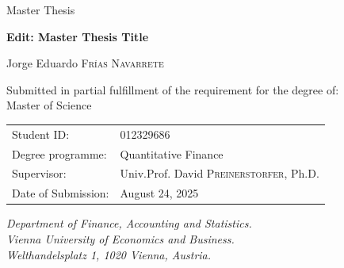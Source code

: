 \documentclass[
  12pt,
  a4paper,
  openany]{scrbook}
\begin{document}
\begin{center}
    \large Master Thesis \\
    \vspace{1cm}

    \textbf{\huge Edit: Master Thesis Title} \\
    \vspace{0.5cm}

        \LARGE Jorge Eduardo \textsc{Frías Navarrete} \\
    \vspace{0.5cm}
        \vspace{2cm}
    
    \normalsize Submitted in partial fulfillment of the requirement for the degree of: \\
    \LARGE Master of Science \\
\vspace{2cm}

\normalsize
    \begin{tabular}{ll}
        Student ID: & 012329686 \\
        Degree programme: & Quantitative Finance \\
        Supervisor: & Univ.Prof. David \textsc{Preinerstorfer}, Ph.D. \\
        Date of Submission: & August 24, 2025
    \end{tabular}
    \vspace{2cm}
    
    \textit{
      Department of Finance, Accounting and Statistics. \\
      Vienna University of Economics and Business. \\
      Welthandelsplatz 1, 1020 Vienna, Austria.
    }

\end{center}

\restoregeometry


% 
\end{document}
